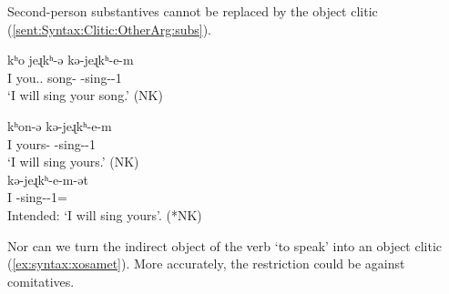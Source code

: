 Second-person substantives cannot be replaced by the object clitic (\ref{sent:Syntax:Clitic:OtherArg:subs}). 

\begin{exe}
	\ex \label{sent:Syntax:Clitic:OtherArg:subs}
	\begin{xlist}
		\ex {}  {kʰo}  {jeɻkʰ-ə} {kə-jeɻkʰ-e-m}
		\\
		I you.{\sg}.{\gen} song-{} {\fut}-sing-{\thgloss}-1{\sg}
		\\
		\trans	`I {will} sing your song.' \hfill    (NK)
		\\
		
		\ex {}  {kʰon-ə} {kə-jeɻkʰ-e-m}  
		\\
		I  yours-{} {\fut}-sing-{\thgloss}-1{\sg}
		\\
		\trans	`I {will} sing yours.' \hfill    (NK)
		\\
		\ex {}  {kə-jeɻkʰ-e-m-ət} 
		\\
		I  {\fut}-sing-{\thgloss}-1{\sg}={\possSsg}
		\\
		\trans	Intended:  `I {will} sing yours’. \hfill   (*NK)
		
	\end{xlist}
\end{exe}

Nor can we turn the indirect object of the verb  `to speak’ into an object clitic (\ref{ex:syntax:xosamet}). More accurately, the restriction could be against comitatives.

